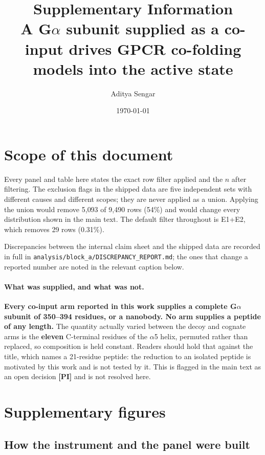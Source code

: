 \documentclass[11pt,a4paper]{article}
\title{Supplementary Information\\
\large A G$\alpha$ subunit supplied as a co-input drives GPCR co-folding models
into the active state}
\author[1]{Aditya Sengar}
\affil[1]{Novartis Biomedical Research}
\date{\today}
\begin{document}
\maketitle
\tableofcontents
\clearpage

\section{Scope of this document}

Every panel and table here states the exact row filter applied and the $n$ after
filtering. The exclusion flags in the shipped data are five independent sets
with different causes and different scopes; they are never applied as a union.
Applying the union would remove 5{,}093 of 9{,}490 rows (54\%) and would change
every distribution shown in the main text. The default filter throughout is
E1+E2, which removes 29 rows (0.31\%).

Discrepancies between the internal claim sheet and the shipped data are recorded
in full in \texttt{analysis/block\_a/DISCREPANCY\_REPORT.md}; the ones that
change a reported number are noted in the relevant caption below.

\paragraph{What was supplied, and what was not.}
\textbf{Every co-input arm reported in this work supplies a complete G$\alpha$
subunit of 350--394 residues, or a nanobody. No arm supplies a peptide of any
length.} The quantity actually varied between the decoy and cognate arms is the
\textbf{eleven} C-terminal residues of the $\alpha$5 helix, permuted rather than
replaced, so composition is held constant. Readers should hold that against the
title, which names a 21-residue peptide: the reduction to an isolated peptide is
motivated by this work and is not tested by it. This is flagged in the main text
as an open decision \textbf{[PI]} and is not resolved here.

\clearpage
\section{Supplementary figures}

\subsection{How the instrument and the panel were built}
\end{document}
